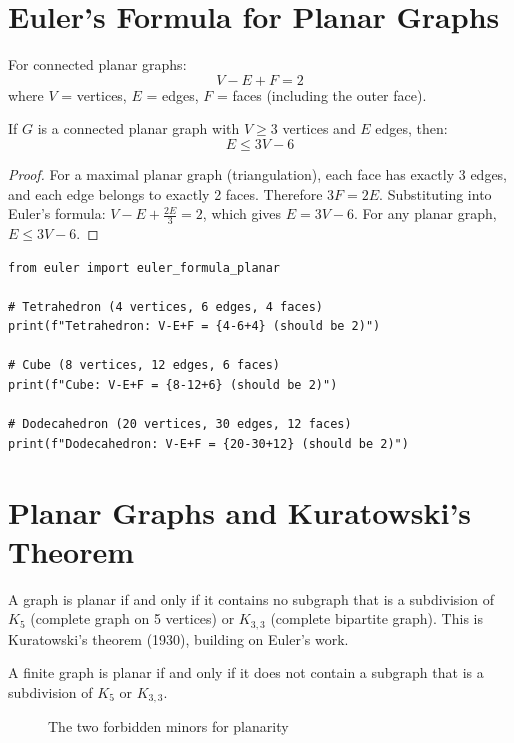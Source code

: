 \section{Euler's Formula for Planar Graphs}

For connected planar graphs:
\[
V - E + F = 2
\]
where $V$ = vertices, $E$ = edges, $F$ = faces (including the outer face).

\begin{theorem}
If $G$ is a connected planar graph with $V \geq 3$ vertices and $E$ edges, then:
\[
E \leq 3V - 6
\]
\end{theorem}

\begin{proof}
For a maximal planar graph (triangulation), each face has exactly 3 edges, and each edge
belongs to exactly 2 faces. Therefore $3F = 2E$. Substituting into Euler's formula:
$V - E + \frac{2E}{3} = 2$, which gives $E = 3V - 6$.
For any planar graph, $E \leq 3V - 6$.
\end{proof}

\begin{lstlisting}[caption={Euler's planar graph formula}, label=lst:euler_planar]
from euler import euler_formula_planar

# Tetrahedron (4 vertices, 6 edges, 4 faces)
print(f"Tetrahedron: V-E+F = {4-6+4} (should be 2)")

# Cube (8 vertices, 12 edges, 6 faces)
print(f"Cube: V-E+F = {8-12+6} (should be 2)")

# Dodecahedron (20 vertices, 30 edges, 12 faces)
print(f"Dodecahedron: V-E+F = {20-30+12} (should be 2)")
\end{lstlisting}

\section{Planar Graphs and Kuratowski's Theorem}

A graph is planar if and only if it contains no subgraph that is a subdivision of $K_5$
(complete graph on 5 vertices) or $K_{3,3}$ (complete bipartite graph). This is Kuratowski's
theorem (1930), building on Euler's work.

\begin{theorem}
A finite graph is planar if and only if it does not contain a subgraph that is a subdivision
of $K_5$ or $K_{3,3}$.
\end{theorem}

\begin{figure}[H]
\centering
{}
\caption{The two forbidden minors for planarity}
\end{figure}

